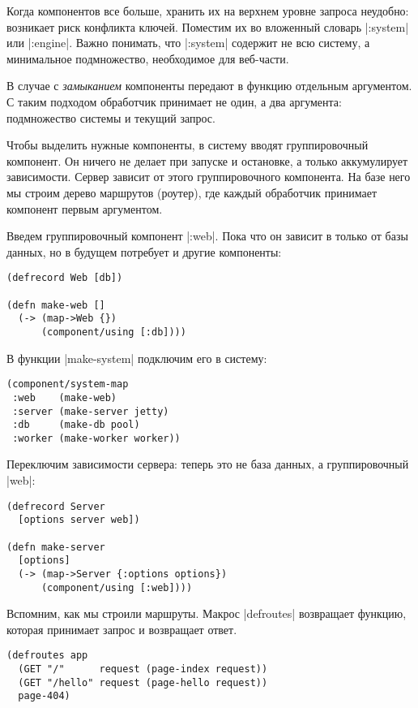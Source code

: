 Когда компонентов все больше, хранить их на верхнем уровне запроса неудобно:
возникает риск конфликта ключей. Поместим их во вложенный словарь
\spverb|:system| или \spverb|:engine|. Важно понимать, что \spverb|:system|
содержит не всю систему, а минимальное подмножество, необходимое для веб-части.

В случае с \emph{замыканием} компоненты передают в функцию отдельным
аргументом. С таким подходом обработчик принимает не один, а два аргумента:
подмножество системы и текущий запрос.

Чтобы выделить нужные компоненты, в систему вводят группировочный компонент. Он
ничего не делает при запуске и остановке, а только аккумулирует
зависимости. Сервер зависит от этого группировочного компонента. На базе него мы
строим дерево маршрутов (роутер), где каждый обработчик принимает компонент
первым аргументом.

Введем группировочный компонент \spverb|:web|. Пока что он зависит в только от
базы данных, но в будущем потребует и другие компоненты:

\begin{verbatim}
(defrecord Web [db])

(defn make-web []
  (-> (map->Web {})
      (component/using [:db])))
\end{verbatim}

В функции \spverb|make-system| подключим его в систему:

\begin{verbatim}
(component/system-map
 :web    (make-web)
 :server (make-server jetty)
 :db     (make-db pool)
 :worker (make-worker worker))
\end{verbatim}

Переключим зависимости сервера: теперь это не база данных, а группировочный
\spverb|web|:

\begin{verbatim}
(defrecord Server
  [options server web])

(defn make-server
  [options]
  (-> (map->Server {:options options})
      (component/using [:web])))
\end{verbatim}

Вспомним, как мы строили маршруты. Макрос \spverb|defroutes| возвращает функцию,
которая принимает запрос и возвращает ответ.

\begin{verbatim}
(defroutes app
  (GET "/"      request (page-index request))
  (GET "/hello" request (page-hello request))
  page-404)
\end{verbatim}


